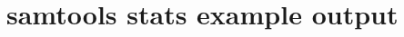\chapter{samtools stats example output}
\label{AppendixA}
\inputminted[fontsize=\scriptsize]{text}{Appendix1/example.bamcheck.SN.txt}
